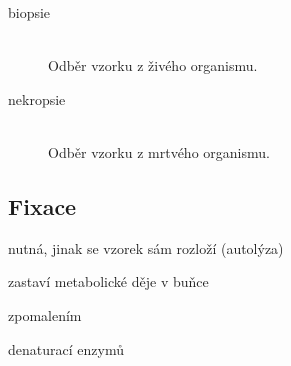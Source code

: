 \documentclass[DIV=8]{scrreprt}
\begin{document}
\begin{description}
\item[biopsie]\hfill \\
Odběr vzorku z živého organismu.


\item[nekropsie]\hfill \\
Odběr vzorku z mrtvého organismu.

\end{description}


\subsection{Fixace} \label{Fixace}


\begin{myItemize}[nosep]
    \item nutná, jinak se vzorek sám rozloží (autolýza)
    \item zastaví metabolické děje v buňce
\begin{myItemize}[nosep]
    \item zpomalením
    \item denaturací enzymů
\end{myItemize}

\end{myItemize}
\end{document}
